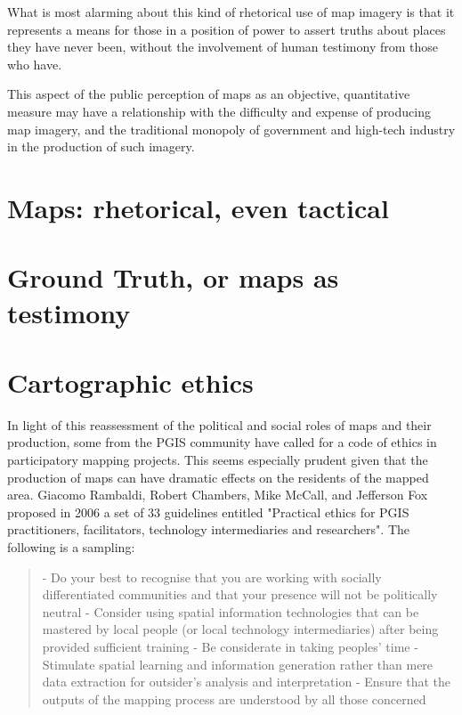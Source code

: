 \documentclass[11pt]{report}
\begin{document}

What is most alarming about this kind of rhetorical use of map imagery is that it represents a means for those in a position of power to assert truths about places they have never been, without the involvement of human testimony from those who have.

This aspect of the public perception of maps as an objective, quantitative measure may have a relationship with the difficulty and expense of producing map imagery, and the traditional monopoly of government and high-tech industry in the production of such imagery.

\section{Maps: rhetorical, even tactical}
\section{Ground Truth, or maps as testimony}

\section{Cartographic ethics}

In light of this reassessment of the political and social roles of maps and their production, some from the PGIS community have called for a code of ethics in participatory mapping projects. This seems especially prudent given that the production of maps can have dramatic effects on the residents of the mapped area. Giacomo Rambaldi, Robert Chambers, Mike McCall, and Jefferson Fox proposed in 2006 a set of 33 guidelines entitled "Practical ethics for PGIS practitioners, facilitators, technology intermediaries and researchers". The following is a sampling:

\begin{quote}
- Do your best to recognise that you are working with socially differentiated communities and that your presence will not be politically neutral
- Consider using spatial information technologies that can be mastered by local people (or local technology intermediaries) after being provided sufficient training
- Be considerate in taking peoples' time
- Stimulate spatial learning and information generation rather than mere data extraction for outsider’s analysis and interpretation
- Ensure that the outputs of the mapping process are understood by all those concerned
\cite{rambaldi2006practical}
\end{quote}
\end{document}
